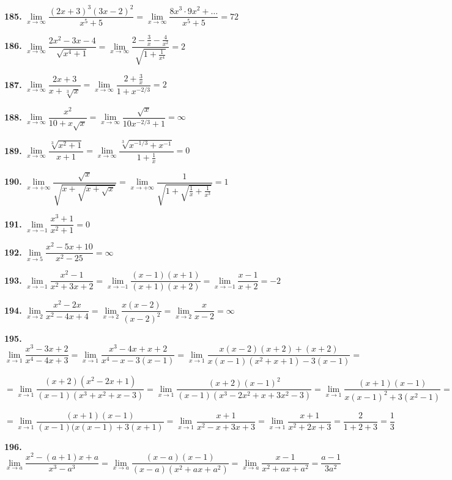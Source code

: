 \documentclass[12pt]{article}
\begin{document}
	
	\medskip
	{\bf 185.} $\lim\limits_{x\to\infty} \dfrac{(2x+3)^3(3x-2)^2}{x^5+5} = \lim\limits_{x\to\infty} \dfrac{8x^3\cdot9x^2+\dots}{x^5+5} = 72$
	
	\medskip
	{\bf 186.} $\lim\limits_{x\to\infty} \dfrac{2x^2-3x-4}{\sqrt{x^4+1}} = \lim\limits_{x\to\infty} \dfrac{2-\frac{3}{x}-\frac{4}{x^2}}{\sqrt{1+\frac{1}{x^4}}} = 2$
	
	\medskip
	{\bf 187.} $\lim\limits_{x\to\infty}\dfrac{2x+3}{x+\sqrt[3]{x}} = \lim\limits_{x\to\infty} \dfrac{2+\frac{3}{x}}{1+x^{-2/3}} = 2$
	
	\medskip
	{\bf 188.} $\lim\limits_{x\to\infty} \dfrac{x^2}{10+x\sqrt{x}} = \lim\limits_{x\to\infty}\dfrac{\sqrt{x}}{10x^{-2/3}+1} = \infty$ 
	
	\medskip
	{\bf 189.} $\lim\limits_{x\to\infty} \dfrac{\sqrt[3]{x^2+1}}{x+1} = \lim\limits_{x\to\infty} \dfrac{\sqrt[3]{x^{-1/3}+x^{-1}}}{1+\frac{1}{x}} = 0$
	
	
	\medskip
	{\bf 190.} $\lim\limits_{x\to+\infty} \dfrac{\sqrt{x}}{\sqrt{x+\sqrt{x+\sqrt{x}}}} = \lim\limits_{x\to+\infty} \dfrac{1}{\sqrt{1+\sqrt{\frac{1}{x}+\frac{1}{x^3}}}} = 1$
	
	\medskip
	{\bf 191.} $\lim\limits_{x\to-1} \dfrac{x^3+1}{x^2+1} = 0$
	
	\medskip
	{\bf 192.} $\lim\limits_{x\to5}\dfrac{x^2-5x+10}{x^2-25} = \infty$
	
	\medskip
	{\bf 193.} $\lim\limits_{x\to-1}\dfrac{x^2-1}{x^2+3x+2} = \lim\limits_{x\to-1}\dfrac{(x-1)(x+1)}{(x+1)(x+2)} = \lim\limits_{x\to-1}\dfrac{x-1}{x+2} = -2$
	
	\medskip
	{\bf 194.} $\lim\limits_{x\to2}\dfrac{x^2-2x}{x^2-4x+4} = \lim\limits_{x\to2} \dfrac{x(x-2)}{(x-2)^2} = \lim\limits_{x\to2}\dfrac{x}{x-2} = \infty$
	
	\medskip
	{\bf 195.} $\lim\limits_{x\to1} \dfrac{x^3-3x+2}{x^4-4x+3} = \lim\limits_{x\to1} \dfrac{x^3-4x+x+2}{x^4-x-3(x-1)} =\lim\limits_{x\to1} \dfrac{x(x-2)(x+2)+(x+2)}{x(x-1)(x^2+x+1)-3(x-1)} = $
	
	$
	= \lim\limits_{x\to1}\dfrac{(x+2)(x^2-2x+1)}{(x-1)(x^3+x^2+x-3)} = \lim\limits_{x\to1}\dfrac{(x+2)(x-1)^2}{(x-1)(x^3-2x^2+x+3x^2-3)} = \lim\limits_{x\to1} \dfrac{(x+1)(x-1)}{x(x-1)^2+3(x^2-1)} = 
	$
	
	$
	= \lim\limits_{x\to1} \dfrac{(x+1)(x-1)}{(x-1)(x(x-1)+3(x+1)} = \lim\limits_{x\to1} \dfrac{x+1}{x^2-x+3x+3} = \lim\limits_{x\to1} \dfrac{x+1}{x^2+2x+3} = \dfrac{2}{1+2+3} = \dfrac{1}{3}
	$
	
	\medskip
	{\bf 196.} $\lim\limits_{x\to a} \dfrac{x^2-(a+1)x+a}{x^3-a^3} = \lim\limits_{x\to a} \dfrac{(x-a)(x-1)}{(x-a)(x^2+ax+a^2)} = \lim\limits_{x\to a} \dfrac{x-1}{x^2+ax+a^2} = \dfrac{a-1}{3a^2}$
	
\end{document}
